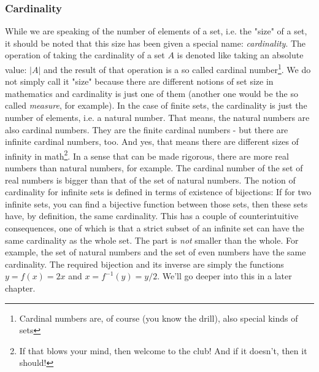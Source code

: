 








\subsubsection{Cardinality} While we are speaking of the number of elements of a set, i.e. the "size" of a set, it should be noted that this size has been given a special name: \emph{cardinality}. The operation of taking the cardinality of a set $A$ is denoted like taking an absolute value: $|A|$ and the result of that operation is a so called cardinal number\footnote{Cardinal numbers are, of course (you know the drill), also special kinds of sets}. We do not simply call it "size" because there are different notions of set size in mathematics and cardinality is just one of them (another one would be the so called \emph{measure}, for example). In the case of finite sets, the cardinality is just the number of elements, i.e. a natural number. That means, the natural numbers are also cardinal numbers. They are the finite cardinal numbers - but there are infinite cardinal numbers, too. And yes, that means there are different sizes of infinity in math\footnote{If that blows your mind, then welcome to the club! And if it doesn't, then it should!}. In a sense that can be made rigorous, there are more real numbers than natural numbers, for example. The cardinal number of the set of real numbers is bigger than that of the set of natural numbers. The notion of cardinality for infinite sets is defined in terms of existence of bijections: If for two infinite sets, you can find a bijective function between those sets, then these sets have, by definition, the same cardinality. This has a couple of counterintuitive consequences, one of which is that a strict subset of an infinite set can have the same cardinality as the whole set. The part is \emph{not} smaller than the whole. For example, the set of natural numbers and the set of even numbers have the same cardinality. The required bijection and its inverse are simply the functions $y = f(x) = 2 x$ and $x = f^{-1}(y) = y / 2$. We'll go deeper into this in a later chapter.

